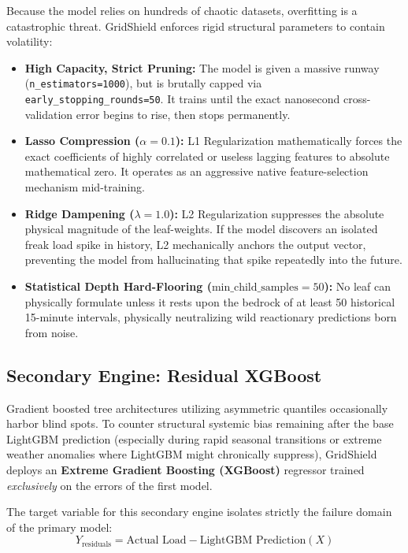 \documentclass[11pt,a4paper]{article}
\begin{document}
Because the model relies on hundreds of chaotic datasets, overfitting is a catastrophic threat. GridShield enforces rigid structural parameters to contain volatility:
\begin{itemize}
    \item \textbf{High Capacity, Strict Pruning:} The model is given a massive runway (\texttt{n\_estimators=1000}), but is brutally capped via \texttt{early\_stopping\_rounds=50}. It trains until the exact nanosecond cross-validation error begins to rise, then stops permanently.
    \item \textbf{Lasso Compression ($\alpha = 0.1$):} L1 Regularization mathematically forces the exact coefficients of highly correlated or useless lagging features to absolute mathematical zero. It operates as an aggressive native feature-selection mechanism mid-training.
    \item \textbf{Ridge Dampening ($\lambda = 1.0$):} L2 Regularization suppresses the absolute physical magnitude of the leaf-weights. If the model discovers an isolated freak load spike in history, L2 mechanically anchors the output vector, preventing the model from hallucinating that spike repeatedly into the future.
    \item \textbf{Statistical Depth Hard-Flooring ($\text{min\_child\_samples}=50$):} No leaf can physically formulate unless it rests upon the bedrock of at least 50 historical 15-minute intervals, physically neutralizing wild reactionary predictions born from noise.
\end{itemize}

\subsection{Secondary Engine: Residual XGBoost}
Gradient boosted tree architectures utilizing asymmetric quantiles occasionally harbor blind spots. To counter structural systemic bias remaining after the base LightGBM prediction (especially during rapid seasonal transitions or extreme weather anomalies where LightGBM might chronically suppress), GridShield deploys an \textbf{Extreme Gradient Boosting (XGBoost)} regressor trained \textit{exclusively} on the errors of the first model.

The target variable for this secondary engine isolates strictly the failure domain of the primary model:
\begin{equation}
Y_{\text{residuals}} = \text{Actual Load} - \text{LightGBM Prediction}(X)
\end{equation}
\end{document}
